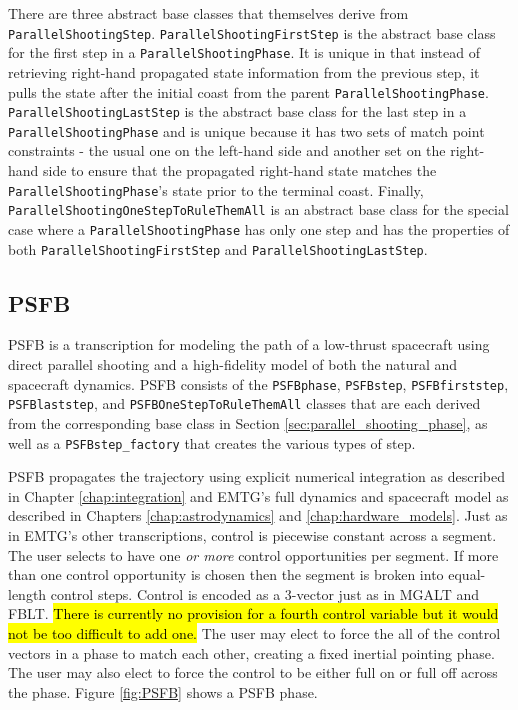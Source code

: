 There are three abstract base classes that themselves derive from \texttt{ParallelShootingStep}. \texttt{ParallelShootingFirstStep} is the abstract base class for the first step in a \texttt{ParallelShootingPhase}. It is unique in that instead of retrieving right-hand propagated state information from the previous step, it pulls the state after the initial coast from the parent \texttt{ParallelShootingPhase}. \texttt{ParallelShootingLastStep} is the abstract base class for the last step in a \texttt{ParallelShootingPhase} and is unique because it has two sets of match point constraints - the usual one on the left-hand side and another set on the right-hand side to ensure that the propagated right-hand state matches the \texttt{ParallelShootingPhase}'s state prior to the terminal coast. Finally, \texttt{ParallelShootingOneStepToRuleThemAll} is an abstract base class for the special case where a \texttt{ParallelShootingPhase} has only one step and has the properties of both \texttt{ParallelShootingFirstStep} and \texttt{ParallelShootingLastStep}.

\subsection{PSFB}
\label{subsec:PSFB}

\ac{PSFB} is a transcription for modeling the path of a low-thrust spacecraft using direct parallel shooting and a high-fidelity model of both the natural and spacecraft dynamics. \ac{PSFB} consists of the \texttt{PSFBphase}, \texttt{PSFBstep}, \texttt{PSFBfirststep}, \texttt{PSFBlaststep}, and \texttt{PSFBOneStepToRuleThemAll} classes that are each derived from the corresponding base class in Section \ref{sec:parallel_shooting_phase}, as well as a \texttt{PSFBstep\_factory} that creates the various types of step.

\ac{PSFB} propagates the trajectory using explicit numerical integration as described in Chapter \ref{chap:integration} and \ac{EMTG}'s full dynamics and spacecraft model as described in Chapters \ref{chap:astrodynamics} and \ref{chap:hardware_models}. Just as in \ac{EMTG}'s other transcriptions, control is piecewise constant across a segment. The user selects to have one \textit{or more} control opportunities per segment. If more than one control opportunity is chosen then the segment is broken into equal-length control steps. Control is encoded as a 3-vector just as in \ac{MGALT} and \ac{FBLT}. \hl{There is currently no provision for a fourth control variable but it would not be too difficult to add one.} The user may elect to force the all of the control vectors in a phase to match each other, creating a fixed inertial pointing phase. The user may also elect to force the control to be either full on or full off across the phase. Figure \ref{fig:PSFB} shows a \ac{PSFB} phase.

